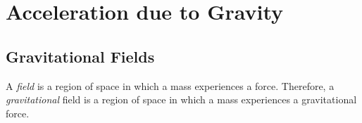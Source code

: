 \section{Acceleration due to Gravity}


\subsection{Gravitational Fields}
A \textit{field} is a region of space in which a mass experiences a force. Therefore, a \textit{gravitational} field is a region of space in which a mass experiences a {gravitational} force.

